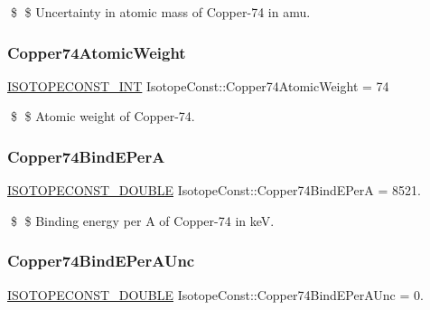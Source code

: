 \$ \$ Uncertainty in atomic mass of Copper-\/74 in amu. \mbox{\label{group___isotope_const-_copper-_cu74_ga8d48e5c9ed03c34d32112bf7f917a52c}} 
\subsubsection{\texorpdfstring{Copper74\+Atomic\+Weight}{Copper74AtomicWeight}}
{\footnotesize\ttfamily \mbox{\hyperlink{group___isotope_const-_macros_ga5f18360b3e99483a35c32d789e62621c}{I\+S\+O\+T\+O\+P\+E\+C\+O\+N\+S\+T\+\_\+\+I\+NT}} Isotope\+Const\+::\+Copper74\+Atomic\+Weight = 74}

\$ \$ Atomic weight of Copper-\/74. \mbox{\label{group___isotope_const-_copper-_cu74_ga220b1537890e8e687098cdf639af6d91}} 
\subsubsection{\texorpdfstring{Copper74\+Bind\+E\+PerA}{Copper74BindEPerA}}
{\footnotesize\ttfamily \mbox{\hyperlink{group___isotope_const-_macros_ga8f45a7272ce02c0b4c65c44636ed719a}{I\+S\+O\+T\+O\+P\+E\+C\+O\+N\+S\+T\+\_\+\+D\+O\+U\+B\+LE}} Isotope\+Const\+::\+Copper74\+Bind\+E\+PerA = 8521.}

\$ \$ Binding energy per A of Copper-\/74 in keV. \mbox{\label{group___isotope_const-_copper-_cu74_gabd896c720fabe2f20ba2f7be4defe35f}} 
\subsubsection{\texorpdfstring{Copper74\+Bind\+E\+Per\+A\+Unc}{Copper74BindEPerAUnc}}
{\footnotesize\ttfamily \mbox{\hyperlink{group___isotope_const-_macros_ga8f45a7272ce02c0b4c65c44636ed719a}{I\+S\+O\+T\+O\+P\+E\+C\+O\+N\+S\+T\+\_\+\+D\+O\+U\+B\+LE}} Isotope\+Const\+::\+Copper74\+Bind\+E\+Per\+A\+Unc = 0.}

